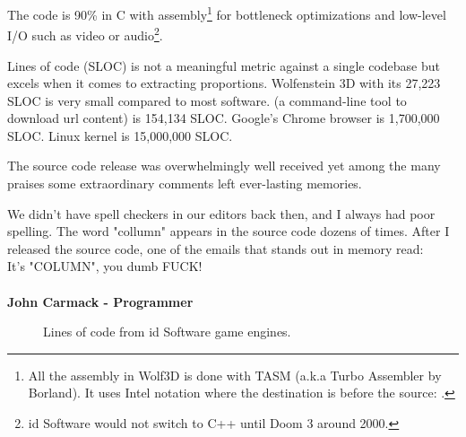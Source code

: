 \documentclass[book.tex]{subfiles}
\begin{document}
\par
 The code is 90\% in C with assembly\footnote{All the assembly in Wolf3D is done with TASM (a.k.a Turbo Assembler by Borland). It uses Intel notation where the destination is before the source:   .} for bottleneck optimizations and low-level I/O such as video or audio\footnote{id Software would not switch to C++ until Doom 3 around 2000.}.\\
 \par
   Lines of code (SLOC) is not a meaningful metric against a single codebase but excels when it comes to extracting proportions. Wolfenstein 3D with its 27,223 SLOC is very small compared to most software.  (a command-line tool to download url content) is 154,134 SLOC. Google's Chrome browser is 1,700,000 SLOC. Linux kernel is 15,000,000 SLOC.\\
\par
The source code release was overwhelmingly well received yet among the many praises some extraordinary comments left ever-lasting memories.\\
\par
 \begin{fancyquotes}
   We didn't have spell checkers in our editors back then, and I always had poor spelling.  The word "collumn" appears in the source code dozens of times.  After I released the source code, one of the emails that stands out in memory read:
 \bigskip \\
It's "COLUMN", you dumb FUCK!\\
 \bigskip \\
\textbf{John Carmack - Programmer}
 \end{fancyquotes}
 \par
\begin{figure}[H]
\centering
   \caption{Lines of code from id Software game engines.}
 \end{figure}
 
\end{document}
